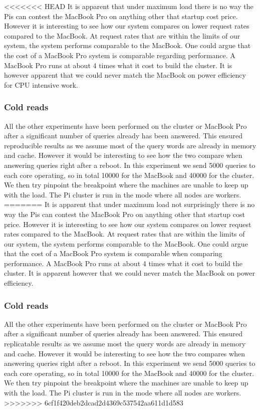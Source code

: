 <<<<<<< HEAD
It is apparent that under maximum load there is no way the Pis can contest the MacBook Pro on anything other that startup cost price.
However it is interesting to see how our system compares on lower request rates compared to the MacBook. 
At request rates that are within the limits of our system, the system performs comparable to the MacBook. One could argue that the cost of a MacBook Pro system is comparable regarding performance. A MacBook Pro runs at about 4 times what it cost to build the cluster. It is however apparent that we could never match the MacBook on power efficiency for CPU intensive work.

\subsubsection{Cold reads}
All the other experiments have been performed on the cluster or MacBook Pro after a significant number of queries already has been answered. This ensured reproducible results as we assume most of the query words are already in memory and cache. However it would be interesting to see how the two compare when answering queries right after a reboot.  In this experiment we send 5000 queries to each core operating, so in total 10000 for the MacBook and 40000 for the cluster. We then try pinpoint the breakpoint where the machines are unable to keep up with the load. The Pi cluster is run in the mode where all nodes are workers.
=======
It is apparent that under maximum load not surprisingly there is no way the Pis can contest the MacBook Pro on anything other that startup cost price.
However it is interesting to see how our system compares on lower request rates compared to the MacBook.
At request rates that are within the limits of our system, the system performs comparable to the MacBook. One could argue that the cost of a MacBook Pro system is comparable when comparing performance. A MacBook Pro runs at about 4 times what it cost to build the cluster. It is apparent however that we could never match the MacBook on power efficiency.

\subsubsection{Cold reads}
\label{sec:coldread}
All the other experiments have been performed on the cluster or MacBook Pro after a significant number of queries already has been answered. This ensured replicatable results as we assume most the query words are already in memory and cache. However it would be interesting to see how the two compares when answering queries right after a reboot. In this experiment we send 5000 queries to each core operating, so in total 10000 for the MacBook and 40000 for the cluster. We then try pinpoint the breakpoint where the machines are unable to keep up with the load. The Pi cluster is run in the mode where all nodes are workers.
>>>>>>> 6cf1f420deb2dcad2d4369c537542aa611d1d583

